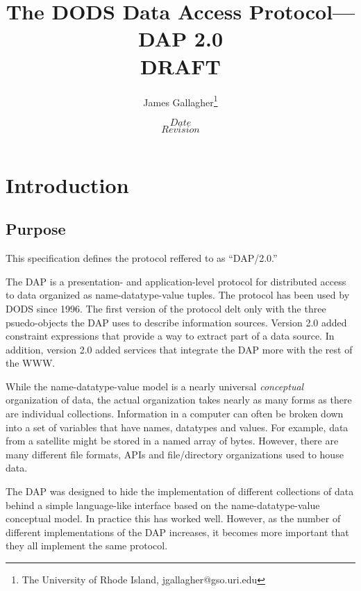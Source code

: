 \documentclass{article}
\begin{document}
\title{The DODS Data Access Protocol---DAP 2.0 \\ DRAFT}
\author{James Gallagher\thanks{The University of Rhode Island,
    jgallagher@gso.uri.edu}}
\date{$Date$ \\ $Revision$}



\maketitle
\T\tableofcontents

\section{Introduction}

\subsection{Purpose}

This specification defines the protocol reffered to as ``DAP/2.0.'' 

The \ac{DAP} is a presentation- and application-level protocol for
distributed access to data organized as name-datatype-value tuples. The
protocol has been used by \ac{DODS} since 1996. The first version of the
protocol delt only with the three psuedo-objects the DAP uses to describe
information sources. Version 2.0 added constraint expressions that provide a
way to extract part of a data source. In addition, version 2.0 added services
that integrate the \ac{DAP} more with the rest of the \ac{WWW}.

While the name-datatype-value model is a nearly universal \emph{conceptual}
organization of data, the actual organization takes nearly as many forms as
there are individual collections. Information in a computer
can often be broken down into a set of variables that have names, datatypes
and values. For example, data from a satellite might be stored in a named
array of bytes. However, there are many different file formats, APIs and
file/directory organizations used to house data.

The \ac{DAP} was designed to hide the implementation of different collections
of data behind a simple language-like interface based on the
name-datatype-value conceptual model. In practice this has worked well.
However, as the number of different implementations of the \ac{DAP}
increases, it becomes more important that they all implement the same
protocol. 
\end{document}
